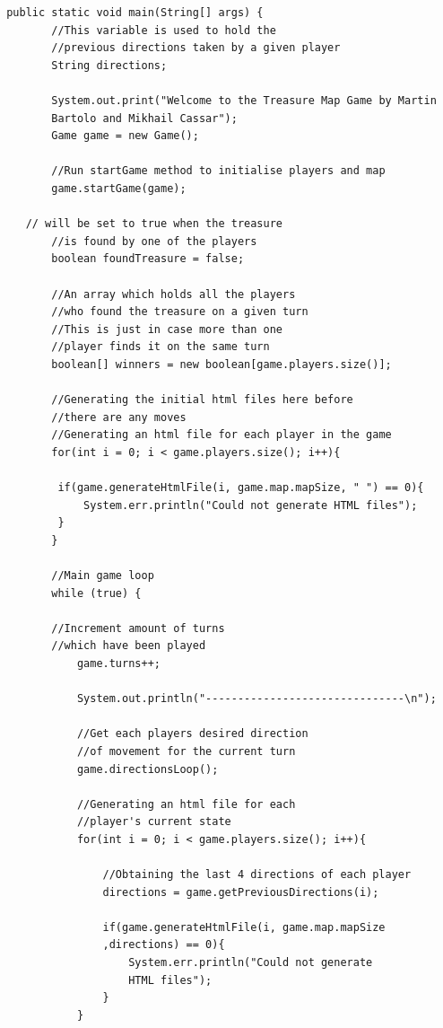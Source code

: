 \documentclass[a4paper,12pt]{extarticle}
\begin{document}
\begin{lstlisting}
 public static void main(String[] args) {
        //This variable is used to hold the 
        //previous directions taken by a given player
        String directions;

        System.out.print("Welcome to the Treasure Map Game by Martin 
        Bartolo and Mikhail Cassar");
        Game game = new Game();

        //Run startGame method to initialise players and map
        game.startGame(game);
        
	// will be set to true when the treasure
        //is found by one of the players
        boolean foundTreasure = false;
        
        //An array which holds all the players 
        //who found the treasure on a given turn
        //This is just in case more than one 
        //player finds it on the same turn
        boolean[] winners = new boolean[game.players.size()];

        //Generating the initial html files here before 
        //there are any moves
        //Generating an html file for each player in the game
        for(int i = 0; i < game.players.size(); i++){

         if(game.generateHtmlFile(i, game.map.mapSize, " ") == 0){
             System.err.println("Could not generate HTML files");
         }
        }

        //Main game loop
        while (true) {
        
        //Increment amount of turns 
        //which have been played        
            game.turns++;

            System.out.println("-------------------------------\n");

            //Get each players desired direction 
            //of movement for the current turn
            game.directionsLoop();

            //Generating an html file for each 
            //player's current state
            for(int i = 0; i < game.players.size(); i++){

                //Obtaining the last 4 directions of each player
                directions = game.getPreviousDirections(i);

                if(game.generateHtmlFile(i, game.map.mapSize
                ,directions) == 0){
                    System.err.println("Could not generate 
                    HTML files");
                }
            }


\end{lstlisting}
\end{document}
